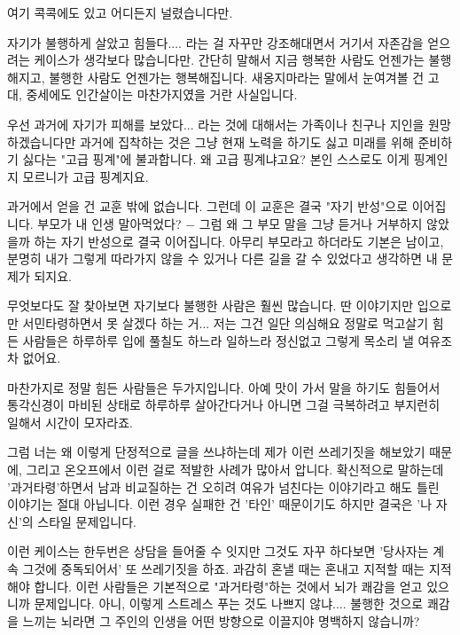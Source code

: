 \vspace{5mm}

여기 콕콕에도 있고 어디든지 널렸습니다만.
\vspace{5mm}

자기가 불행하게 살았고 힘들다.... 라는 걸 자꾸만 강조해대면서 거기서 자존감을 얻으려는 케이스가 생각보다 많습니다만.
간단히 말해서 지금 행복한 사람도 언젠가는 불행해지고, 불행한 사람도 언젠가는 행복해집니다.
새옹지마라는 말에서 눈여겨볼 건 고대, 중세에도 인간살이는 마찬가지였을 거란 사실입니다.
\vspace{5mm}

우선 과거에 자기가 피해를 보았다... 라는 것에 대해서는 가족이나 친구나 지인을 원망하겠습니다만
과거에 집착하는 것은 그냥 현재 노력을 하기도 싫고 미래를 위해 준비하기 싫다는 "고급 핑계"에 불과합니다.
왜 고급 핑계냐고요? 본인 스스로도 이게 핑계인지 모르니가 고급 핑계지요.
\vspace{5mm}

과거에서 얻을 건 교훈 밖에 없습니다. 그런데 이 교훈은 결국 "자기 반성"으로 이어집니다.
부모가 내 인생 말아먹었다? $-$ 그럼 왜 그 부모 말을 그냥 듣거나 거부하지 않았을까 하는 자기 반성으로 결국 이어집니다.
아무리 부모라고 하더라도 기본은 남이고,
분명히 내가 그렇게 따라가지 않을 수 있거나 다른 길을 갈 수 있었다고 생각하면 내 문제가 되지요.
\vspace{5mm}

무엇보다도 잘 찾아보면 자기보다 불행한 사람은 훨씬 많습니다.
딴 이야기지만 입으로만 서민타령하면서 못 살겠다 하는 거... 저는 그건 일단 의심해요
정말로 먹고살기 힘든 사람들은 하루하루 입에 풀칠도 하느라 일하느라 정신없고 그렇게 목소리 낼 여유조차 없어요.
\vspace{5mm}

마찬가지로 정말 힘든 사람들은 두가지입니다.
아예 맛이 가서 말을 하기도 힘들어서 통각신경이 마비된 상태로 하루하루 살아간다거나
아니면 그걸 극복하려고 부지런히 일해서 시간이 모자라죠.
\vspace{5mm}

그럼 너는 왜 이렇게 단정적으로 글을 쓰냐하는데 제가 이런 쓰레기짓을 해보았기 때문에,
그리고 온오프에서 이런 걸로 적발한 사례가 많아서 압니다.
확신적으로 말하는데 '과거타령'하면서 남과 비교질하는 건
오히려 여유가 넘친다는 이야기라고 해도 틀린 이야기는 절대 아닙니다.
이런 경우 실패한 건 '타인' 때문이기도 하지만 결국은 '나 자신'의 스타일 문제입니다.
\vspace{5mm}

이런 케이스는 한두번은 상담을 들어줄 수 잇지만 그것도 자꾸 하다보면
'당사자는 계속 그것에 중독되어서' 또 쓰레기짓을 하죠.
과감히 혼낼 때는 혼내고 지적할 때는 지적해야 합니다.
이런 사람들은 기본적으로 "과거타령"하는 것에서 뇌가 쾌감을 얻고 있으니까 문제입니다.
아니, 이렇게 스트레스 푸는 것도 나쁘지 않냐....
불행한 것으로 쾌감을 느끼는 뇌라면 그 주인의 인생을 어떤 방향으로 이끌지야 명백하지 않습니까?
\vspace{5mm}

